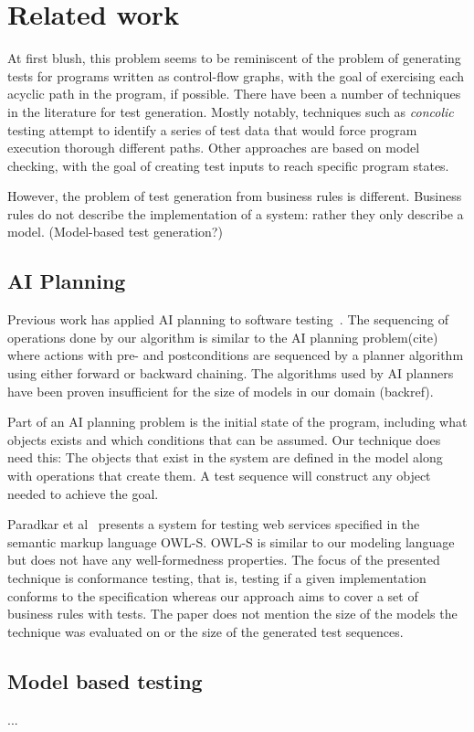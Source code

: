 \section{Related work}

At first blush, this problem seems to be reminiscent of the problem of generating tests for programs 
written as control-flow graphs, with the goal of exercising each acyclic path in the program, if
possible.  There have been a number of techniques in the literature for test generation. Mostly
notably, techniques such as \textit{concolic} testing attempt to identify a series of test data 
that would force program execution thorough different paths.  Other approaches are based on model
checking, with the goal of creating test inputs to reach specific program states.

However, the problem of test generation from business rules is different.  Business rules do not
describe the implementation of a system: rather they only describe a model.  (Model-based test 
generation?)

\subsection{AI Planning}

Previous work has applied AI planning to software testing~\cite{Scheetz99ai,Howe97testcase}. The sequencing of operations done by our algorithm is similar to the AI planning problem(cite) where actions with pre- and postconditions are sequenced by a planner algorithm using either forward or backward chaining. The algorithms used by AI planners have been proven insufficient for the size of models in our domain (backref). 

Part of an AI planning problem is the initial state of the program, including what objects exists and which conditions that can be assumed. Our technique does need this: The objects that exist in the system are defined in the model along with operations that create them. A test sequence will construct any object needed to achieve the goal. 

Paradkar et al~\cite{conf/icws/ParadkarSWJOSL07} presents a system for testing web services specified in the semantic markup language OWL-S. OWL-S is similar to our modeling language but does not have any well-formedness properties. The focus of the presented technique is conformance testing, that is, testing if a given implementation conforms to the specification whereas our approach aims to cover a set of business rules with tests. The paper does not mention the size of the models the technique was evaluated on or the size of the generated test sequences.


\subsection{Model based testing}

...